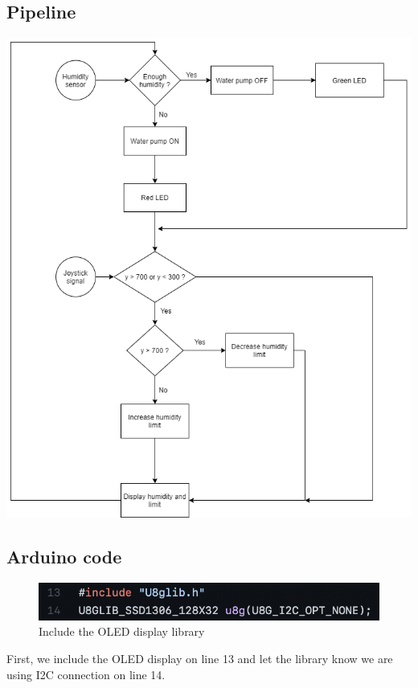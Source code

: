 \documentclass[12pt]{article}
\begin{document}
    \subsection{Pipeline}
    \begin{center}
        \includegraphics[scale = 0.5]{./images/flow chart.png}
    \end{center}
    \newpage
    \subsection{Arduino code}
    \begin{figure}[H]
        \centering
        \includegraphics[width=14cm]{./images/include_lib.png}
        \caption{Include the OLED display library}
        \label{fig:include_lib}
    \end{figure}
    
    First, we include the OLED display on line 13 and let the library know we are using I2C connection on line 14.
    
\end{document}
